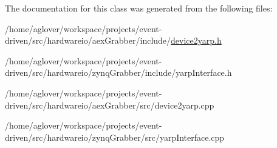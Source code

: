 The documentation for this class was generated from the following files\+:\begin{DoxyCompactItemize}
\item 
/home/aglover/workspace/projects/event-\/driven/src/hardwareio/aex\+Grabber/include/\hyperlink{device2yarp_8h}{device2yarp.\+h}\item 
/home/aglover/workspace/projects/event-\/driven/src/hardwareio/zynq\+Grabber/include/yarp\+Interface.\+h\item 
/home/aglover/workspace/projects/event-\/driven/src/hardwareio/aex\+Grabber/src/device2yarp.\+cpp\item 
/home/aglover/workspace/projects/event-\/driven/src/hardwareio/zynq\+Grabber/src/yarp\+Interface.\+cpp\end{DoxyCompactItemize}
